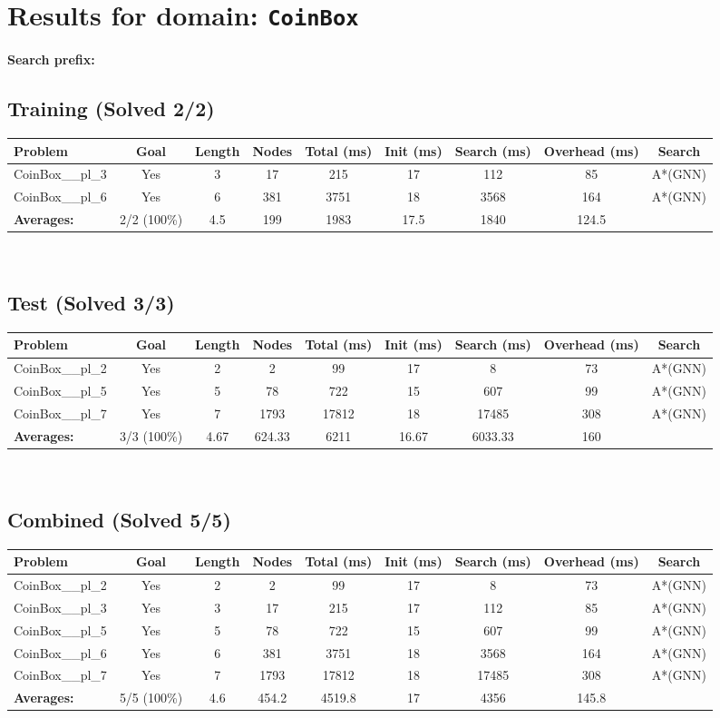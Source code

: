 \documentclass{article}
\begin{document}
\section*{Results for domain: \texttt{CoinBox}}
\textbf{Search prefix:} 
\\[0.5cm]
\subsection*{Training (Solved 2/2)}
\begin{tabular}{lcccccccc}
\toprule
Problem & Goal & Length & Nodes & Total (ms) & Init (ms) & Search (ms) & Overhead (ms) & Search \\
\midrule
CoinBox\_\_pl\_3 & Yes & 3 & 17 & 215 & 17 & 112 & 85 & A*(GNN) \\
CoinBox\_\_pl\_6 & Yes & 6 & 381 & 3751 & 18 & 3568 & 164 & A*(GNN) \\
\textbf{Averages:} & 2/2 (100\%) & 4.5 & 199 & 1983 & 17.5 & 1840 & 124.5 & \\
\bottomrule
\end{tabular}
\\[0.7cm]
\subsection*{Test (Solved 3/3)}
\begin{tabular}{lcccccccc}
\toprule
Problem & Goal & Length & Nodes & Total (ms) & Init (ms) & Search (ms) & Overhead (ms) & Search \\
\midrule
CoinBox\_\_pl\_2 & Yes & 2 & 2 & 99 & 17 & 8 & 73 & A*(GNN) \\
CoinBox\_\_pl\_5 & Yes & 5 & 78 & 722 & 15 & 607 & 99 & A*(GNN) \\
CoinBox\_\_pl\_7 & Yes & 7 & 1793 & 17812 & 18 & 17485 & 308 & A*(GNN) \\
\textbf{Averages:} & 3/3 (100\%) & 4.67 & 624.33 & 6211 & 16.67 & 6033.33 & 160 & \\
\bottomrule
\end{tabular}
\\[0.7cm]
\subsection*{Combined (Solved 5/5)}
\begin{tabular}{lcccccccc}
\toprule
Problem & Goal & Length & Nodes & Total (ms) & Init (ms) & Search (ms) & Overhead (ms) & Search \\
\midrule
CoinBox\_\_pl\_2 & Yes & 2 & 2 & 99 & 17 & 8 & 73 & A*(GNN) \\
CoinBox\_\_pl\_3 & Yes & 3 & 17 & 215 & 17 & 112 & 85 & A*(GNN) \\
CoinBox\_\_pl\_5 & Yes & 5 & 78 & 722 & 15 & 607 & 99 & A*(GNN) \\
CoinBox\_\_pl\_6 & Yes & 6 & 381 & 3751 & 18 & 3568 & 164 & A*(GNN) \\
CoinBox\_\_pl\_7 & Yes & 7 & 1793 & 17812 & 18 & 17485 & 308 & A*(GNN) \\
\textbf{Averages:} & 5/5 (100\%) & 4.6 & 454.2 & 4519.8 & 17 & 4356 & 145.8 & \\
\bottomrule
\end{tabular}
\\[0.7cm]
\end{document}

